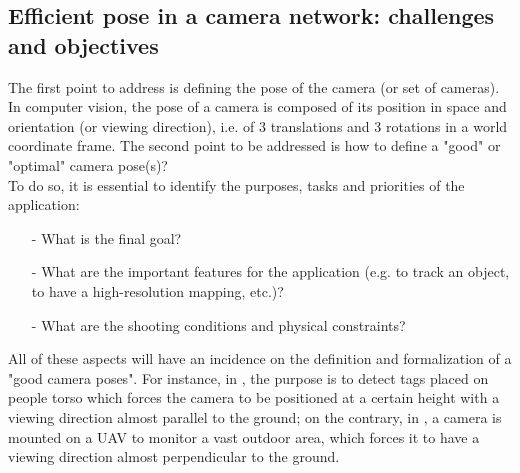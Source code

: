 \subsection{Efficient pose in a camera network: challenges and objectives}
The first point to address is defining the pose of the camera (or set of cameras). In computer vision, the pose of a camera is composed of its position in space and orientation (or viewing direction), i.e. of 3 translations and 3 rotations in a world coordinate frame. The second point to be addressed is how to define a "good" or "optimal" camera pose(s)?\\
 To do so, it is essential to identify the purposes, tasks and priorities of the application: 
 \begin{itemize}
 \item [-] What is the final goal?
 \item [-] What are the important features for the application (e.g. to track an object, to have a high-resolution mapping, etc.)?
 \item [-] What are the shooting conditions and physical constraints?
 \end{itemize}
   All of these aspects will have an incidence on the definition and formalization of a "good camera poses". For instance, in \cite{22*zhao2008}, the purpose is to detect tags placed on people torso which forces the camera to be positioned at a certain height with a viewing direction almost parallel to the ground; on the contrary, in \cite{146*li2011}, a camera is mounted on a UAV to monitor a vast outdoor area, which forces it to have a viewing direction almost perpendicular to the ground. 


